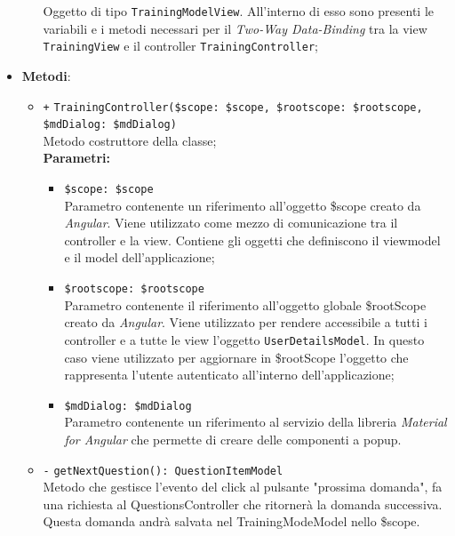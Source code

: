 \begin{itemize}
\begin{itemize}
		Oggetto di tipo \texttt{TrainingModelView}. All'interno di esso sono presenti le variabili e i metodi necessari per il \textit{Two-Way Data-Binding} tra la view \texttt{TrainingView} e il controller \texttt{TrainingController};
	\end{itemize}
	\item \textbf{Metodi}:
	\begin{itemize}
		\item \texttt{+} \texttt{TrainingController(\$scope: \$scope, \$rootscope: \$rootscope, \$mdDialog: \$mdDialog)} \\ Metodo costruttore della classe; \\
		\textbf{Parametri:}
		\begin{itemize}
			\item \texttt{\$scope: \$scope} \\
			Parametro contenente un riferimento all’oggetto \$scope creato da \textit{Angular}. Viene utilizzato come mezzo di comunicazione tra il controller e la view. Contiene gli oggetti che definiscono il viewmodel e il model dell’applicazione;
			\item \texttt{\$rootscope: \$rootscope}\\
			Parametro contenente il riferimento all'oggetto globale \$rootScope creato da \textit{Angular}. Viene utilizzato per rendere accessibile a tutti i controller e a tutte le view l'oggetto \texttt{UserDetailsModel}. In questo caso viene utilizzato per aggiornare in \$rootScope l'oggetto che rappresenta l'utente autenticato all'interno dell'applicazione;
			\item \texttt{\$mdDialog: \$mdDialog} \\
			Parametro contenente un riferimento al servizio della libreria \textit{Material for Angular} che permette di creare delle componenti a popup.
		\end{itemize}
		\item \texttt{-} \texttt{getNextQuestion(): QuestionItemModel} \\ Metodo che gestisce l'evento del click al pulsante "prossima domanda", fa una richiesta al QuestionsController che ritornerà la domanda successiva. Questa domanda andrà salvata nel TrainingModeModel nello \$scope.
	\end{itemize}
\end{itemize}

